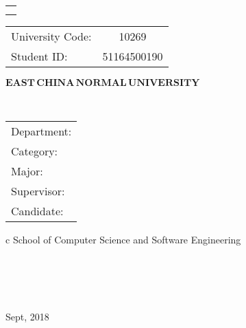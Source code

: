 

\pagestyle{empty}

\begin{flushleft}
	\begin{tabular}{l}
		\noindent{ Dissertation for master degree in 2019}  \\ 
		\noindent{  (Professional)}\\ 
	\end{tabular}
\hspace{40pt} 
	\begin{tabular}{lc}
	 University Code:  &  10269  \\ 
 Student ID: &    51164500190  \\ 
	\end{tabular}
\end{flushleft}

\vskip 2cm

\begin{center}
{\Huge $\mathbf{EAST}\,\mathbf{CHINA}\,\mathbf{NORMAL}\,
\mathbf{UNIVERSITY}$}
\end{center}

\vskip 3cm

\begin{center}
\bfseries{\scshape{\huge \TheisNameEn
}}\\
\end{center}

\vskip 3.5cm {\large
\begin{center}
\begin{tabular}{l}
Department:\\
Category:\\ 
Major:\\ 
Supervisor:\\
Candidate:
\end{tabular}
\begin{tabular}c
\normalsize{{School of Computer Science and Software Engineering}}\\
\hline ~~~  \\
\hline ~~~  \\
\hline ~~~ \\
\hline ~~~  \\

\hline
\end{tabular}
\end{center}}

\vskip 30mm

\begin{center}
{\Large Sept, 2018}
\end{center}
